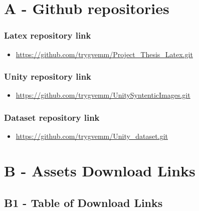 \chapter*{A - Github repositories}
\label{github}


\subsection*{Latex repository link}
\begin{itemize}
    \item \url{https://github.com/trygvemm/Project_Thesis_Latex.git}
\end{itemize}
\subsection*{Unity repository link}
\begin{itemize}
    \item \url{https://github.com/trygvemm/UnitySyntenticImages.git}
\end{itemize}
\subsection*{Dataset repository link}
\begin{itemize}
    \item \url{https://github.com/trygvemm/Unity_dataset.git}
\end{itemize}





\chapter*{B - Assets Download Links}

\renewcommand{\thefigure}{B.\arabic{figure}}
\setcounter{figure}{0}
\renewcommand{\thetable}{B.\arabic{table}}
\setcounter{table}{0}


\section*{\large{B1 - Table of Download Links}}
\vspace*{1cm}

